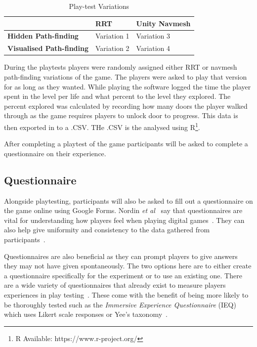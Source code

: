 \documentclass[journal]{IEEEtran}
\begin{document}
\begin{table}[H]
	\centering
	\caption{Play-test Variations}
	\label{table:PlaytestVariations}
	\def\arraystretch{1.5}
	\begin{tabular}{ |l|l|l|}
		\hline
			  							& \textbf{RRT}& \textbf{Unity Navmesh} \\
		\hline
		\textbf{Hidden Path-finding}	& Variation 1			& Variation 3 \\
		\hline
		\textbf{Visualised Path-finding}& Variation 2		  	& Variation 4 \\
		\hline
	\end{tabular}
\end{table}

During the playtests players were randomly assigned either RRT or navmesh path-finding variations of the game. The players were asked to play that version for as long as they wanted. While playing the software logged the time the player spent in the level per life and what percent to the level they explored. The percent explored was calculated by recording how many doors the player walked through as the game requires players to unlock door to progress. This data is then exported in to a .CSV. THe .CSV is the analysed using R\footnote[2]{R Available: https://www.r-project.org/}.


After completing a playtest of the game participants will be asked to complete a questionnaire on their experience.

\subsection{Questionnaire} \label{Questionnaire}

Alongside playtesting, participants will also be asked to fill out a questionnaire on the game online using Google Forms. Nordin \textit{et al}~\cite{nordin2014} say that questionnaires are vital for understanding how players feel when playing digital games~\cite{nordin2014,Denisova2016}. They can also help give uniformity and consistency to the data gathered from participants~\cite{Denisova2016}.

Questionnaires are also beneficial as they can prompt players to give answers they may not have given spontaneously. The two options here are to either create a questionnaire specifically for the experiment or to use an existing one. There are a wide variety of questionnaires that already exist to measure players experiences in play testing~\cite{nordin2014, Jennett2008}. These come with the benefit of being more likely to be thoroughly tested such as the \textit{Immersive Experience Questionnaire} (IEQ) which uses Likert scale responses or Yee's taxonomy~\cite{nordin2014, Jennett2008, Yee2006, Yee2012}.
\end{document}
